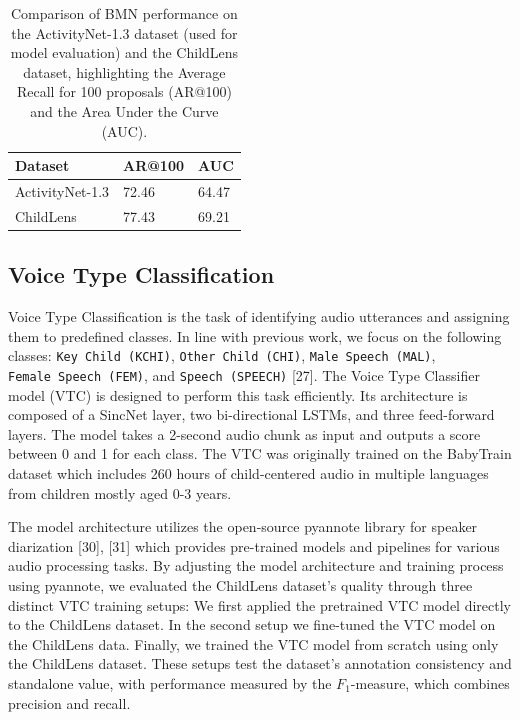 \documentclass[
  man,floatsintext]{apa6}
\begin{document}
\begin{table}[tbp]

\begin{center}
\begin{threeparttable}

\caption{\label{tab:bmn-results}Comparison of BMN performance on the ActivityNet-1.3 dataset (used for model evaluation) and the ChildLens dataset, highlighting the Average Recall for 100 proposals (AR@100) and the Area Under the Curve (AUC).}

\begin{tabular}{lll}
\toprule
Dataset & \multicolumn{1}{c}{AR@100} & \multicolumn{1}{c}{AUC}\\
\midrule
ActivityNet-1.3 & 72.46 & 64.47\\
ChildLens & 77.43 & 69.21\\
\bottomrule
\end{tabular}

\end{threeparttable}
\end{center}

\end{table}

\subsection{Voice Type Classification}\label{voice-type-classification}

Voice Type Classification is the task of identifying audio utterances and assigning them to predefined classes. In line with previous work, we focus on the following classes: \texttt{Key\ Child\ (KCHI)}, \texttt{Other\ Child\ (CHI)}, \texttt{Male\ Speech\ (MAL)}, \texttt{Female\ Speech\ (FEM)}, and \texttt{Speech\ (SPEECH)} {[}27{]}. The Voice Type Classifier model (VTC) is designed to perform this task efficiently. Its architecture is composed of a SincNet layer, two bi-directional LSTMs, and three feed-forward layers. The model takes a 2-second audio chunk as input and outputs a score between 0 and 1 for each class. The VTC was originally trained on the BabyTrain dataset which includes 260 hours of child-centered audio in multiple languages from children mostly aged 0-3 years.

The model architecture utilizes the open-source pyannote library for speaker diarization {[}30{]}, {[}31{]} which provides pre-trained models and pipelines for various audio processing tasks. By adjusting the model architecture and training process using pyannote, we evaluated the ChildLens dataset's quality through three distinct VTC training setups: We first applied the pretrained VTC model directly to the ChildLens dataset. In the second setup we fine-tuned the VTC model on the ChildLens data. Finally, we trained the VTC model from scratch using only the ChildLens dataset. These setups test the dataset's annotation consistency and standalone value, with performance measured by the \(F_1\)-measure, which combines precision and recall.
\end{document}
